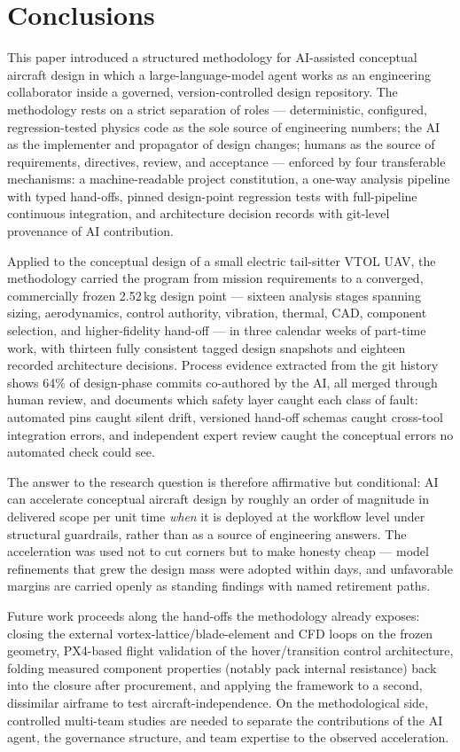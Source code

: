 \section{Conclusions}
\label{sec:conclusions}

This paper introduced a structured methodology for AI-assisted
conceptual aircraft design in which a large-language-model agent works
as an engineering collaborator inside a governed, version-controlled
design repository. The methodology rests on a strict separation of
roles --- deterministic, configured, regression-tested physics code as
the sole source of engineering numbers; the AI as the implementer and
propagator of design changes; humans as the source of requirements,
directives, review, and acceptance --- enforced by four transferable
mechanisms: a machine-readable project constitution, a one-way
analysis pipeline with typed hand-offs, pinned design-point regression
tests with full-pipeline continuous integration, and architecture
decision records with git-level provenance of AI contribution.

Applied to the conceptual design of a small electric tail-sitter VTOL
UAV, the methodology carried the program from mission requirements to
a converged, commercially frozen 2.52\,kg design point --- sixteen
analysis stages spanning sizing, aerodynamics, control authority,
vibration, thermal, CAD, component selection, and higher-fidelity
hand-off --- in three calendar weeks of part-time work, with thirteen
fully consistent tagged design snapshots and eighteen recorded
architecture decisions. Process evidence extracted from the git
history shows 64\% of design-phase commits co-authored by the AI, all
merged through human review, and documents which safety layer caught
each class of fault: automated pins caught silent drift, versioned
hand-off schemas caught cross-tool integration errors, and independent
expert review caught the conceptual errors no automated check could
see.

The answer to the research question is therefore affirmative but
conditional: AI can accelerate conceptual aircraft design by roughly
an order of magnitude in delivered scope per unit time \emph{when} it
is deployed at the workflow level under structural guardrails, rather
than as a source of engineering answers. The acceleration was used not
to cut corners but to make honesty cheap --- model refinements that
grew the design mass were adopted within days, and unfavorable margins
are carried openly as standing findings with named retirement paths.

Future work proceeds along the hand-offs the methodology already
exposes: closing the external vortex-lattice/blade-element and CFD
loops on the frozen geometry, PX4-based flight validation of the
hover/transition control architecture, folding measured component
properties (notably pack internal resistance) back into the closure
after procurement, and applying the framework to a second, dissimilar
airframe to test aircraft-independence. On the methodological side,
controlled multi-team studies are needed to separate the contributions
of the AI agent, the governance structure, and team expertise to the
observed acceleration.
